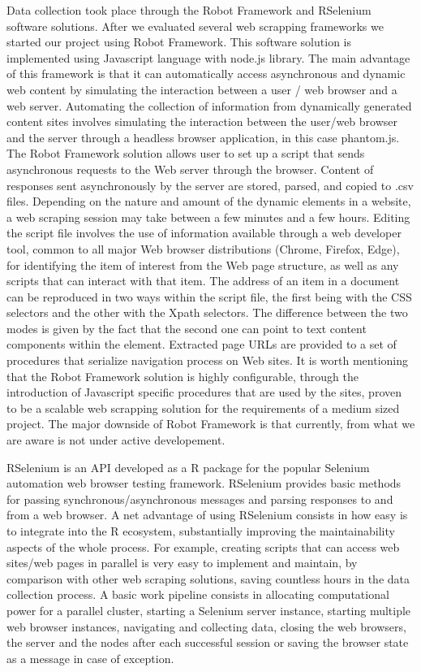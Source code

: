 \documentclass[]{article}
\begin{document}
Data collection took place through the Robot Framework and RSelenium software solutions. 
After we evaluated several web scrapping frameworks we started our project using Robot Framework. This software solution is implemented using Javascript language with node.js library.
The main advantage of this framework is that it can automatically access asynchronous and dynamic web content by simulating the interaction between a user / web browser and a web server. Automating the collection of information from dynamically generated content sites involves simulating the interaction between the user/web browser and the server through a headless browser application, in this case phantom.js. The Robot Framework solution allows user to set up a script that sends asynchronous requests to the Web server through the browser. Content of responses sent asynchronously by the server are stored, parsed, and copied to .csv files. Depending on the nature and amount of the dynamic elements in a website, a web scraping session may take between a few minutes and a few hours.
Editing the script file involves the use of information available through a web developer tool, common to all major Web browser distributions (Chrome, Firefox, Edge), for identifying the item of interest from the Web page structure, as well as any scripts that can interact with that item. The address of an item in a document can be reproduced in two ways within the script file, the first being with the CSS selectors and the other with the Xpath selectors. The difference between the two modes is given by the fact that the second one can point to text content components within the element. Extracted page URLs are provided to a set of procedures that serialize navigation process on Web sites. It is worth mentioning that the Robot Framework solution is highly configurable, through the introduction of Javascript specific procedures that are used by the sites, proven to be a scalable web scrapping solution for the requirements of a medium sized project. The major downside of Robot Framework is that currently, from what we are aware is not under active developement.

RSelenium \cite{rs1} is an API developed as a R package for the popular Selenium automation web browser testing framework. RSelenium provides basic methods for passing synchronous/asynchronous messages and parsing responses to and from a web browser. A net advantage of using RSelenium consists in how easy is to integrate into the R ecosystem, substantially improving the maintainability aspects of the whole process. For example, creating scripts that can access web sites/web pages in parallel \cite{dopar}\cite{foreach} is very easy to implement and maintain, by comparison with other web scraping solutions, saving countless hours in the data collection process. A basic work pipeline consists in allocating computational power for a parallel cluster, starting a Selenium server instance, starting multiple web browser instances, navigating and collecting data, closing the web browsers, the server and the nodes after each successful session or saving the browser state as a message in case of exception.   
\end{document}
